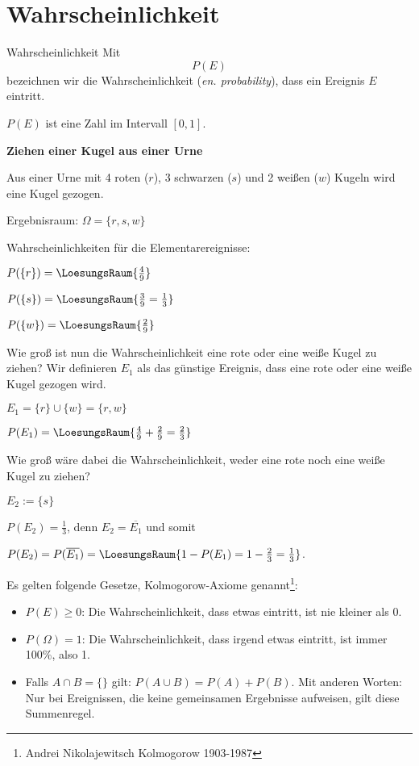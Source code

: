 
\section{Wahrscheinlichkeit}
\begin{definition}{Wahrscheinlichkeit}{}
Mit $$P(E)$$ bezeichnen wir die Wahrscheinlichkeit (\textit{en. probability}), dass ein Ereignis $E$ eintritt.

$P(E)$ ist eine Zahl im Intervall $[0,1]$.
\end{definition}

\begin{beispiel}{}{}\textbf{Ziehen einer Kugel aus einer Urne}

Aus einer Urne mit 4 roten ($r$), 3 schwarzen ($s$) und 2 weißen ($w$) Kugeln wird eine Kugel gezogen.

Ergebnisraum: $\Omega = \{r, s, w\}$



Wahrscheinlichkeiten für die Elementarereignisse:

$P(\{r\}) = \LoesungsRaum{\frac49}$

$P(\{s\}) = \LoesungsRaum{\frac39 = \frac13}$

$P(\{w\}) = \LoesungsRaum{\frac29}$

Wie groß ist nun die Wahrscheinlichkeit eine rote oder eine weiße Kugel zu ziehen?
Wir definieren $E_1$ als das günstige Ereignis, dass eine rote oder eine weiße Kugel gezogen wird.

$E_1 = \{r\} \cup \{w\} = \{r,w\}$

$P(E_1) = \LoesungsRaum{\frac49 + \frac29 = \frac23}$



Wie groß wäre dabei die Wahrscheinlichkeit, weder eine rote noch eine weiße Kugel zu ziehen?

$E_2 := \{s\}$

$P(E_2) = \frac13$, denn $E_2 = \overline{E_1}$ und somit

$P(E_2) = P(\overline{E_1}) = \LoesungsRaum{1 - P(E_1) = 1 - \frac23 = \frac13}$.

\end{beispiel}
\newpage


Es gelten folgende Gesetze, Kolmogorow-Axiome genannt\footnote{Andrei Nikolajewitsch
  Kolmogorow 1903-1987}:

\begin{gesetz}{}{}
\begin{itemize}
\item $P(E) \ge 0$: Die Wahrscheinlichkeit, dass etwas eintritt, ist nie kleiner als 0.
\item $P(\Omega) = 1$: Die Wahrscheinlichkeit, dass irgend etwas eintritt, ist immer 100\%, also 1.
\item Falls $A \cap B = \{\}$ gilt: $P(A\cup B) = P(A) + P(B)$. Mit anderen Worten: Nur bei Ereignissen, die keine gemeinsamen Ergebnisse aufweisen, gilt diese Summenregel.
\end{itemize}
\end{gesetz}

